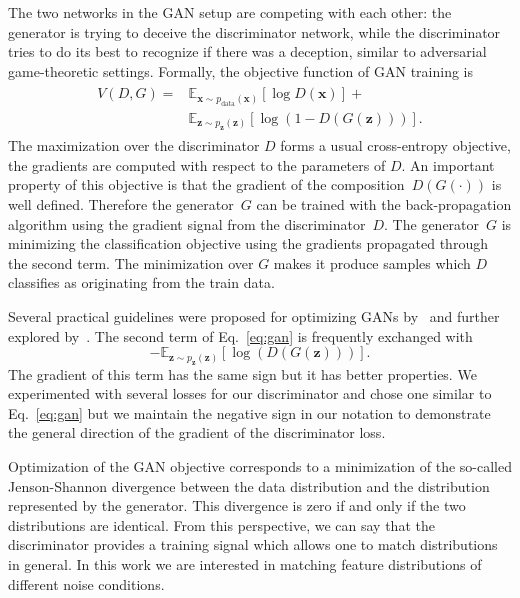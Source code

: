 \documentclass[a4paper]{article}
\begin{document}
    The two networks in the GAN setup are competing with each other: the 
    generator is trying to deceive the discriminator network, while the discriminator tries
    to do its best to recognize if there was a deception, similar to adversarial game-theoretic settings.    
    Formally, the objective function of GAN training is
    \begin{align}
    \begin{split}
        V(D, G) = &\mathbb{E}_{\bm{x} \sim p_{\text{data}}(\bm{x})}[\log D(\bm{x})] + \\
            &\mathbb{E}_{\bm{z} \sim p_{\bm{z}}(\bm{z})}[\log (1 - D(G(\bm{z})))].
    \end{split}
    \label{eq:gan}
    \end{align}
    The maximization over the discriminator $D$ forms a usual cross-entropy objective, the gradients are
    computed with respect to the parameters of $D$. An important property of
    this objective is that the gradient of the composition~$D(G(\cdot))$ is well
    defined. Therefore the generator~$G$ can be trained with the back-propagation
    algorithm using the gradient signal from the discriminator~$D$.
    The generator~$G$ is
    minimizing the classification objective using the gradients
    propagated through the second term. The minimization over $G$ makes it
    produce samples which $D$ classifies as originating from the train data.

    Several practical guidelines were proposed for optimizing GANs by~\cite{radford2015unsupervised} and 
    further explored by~\cite{salimans2016improved}. The second term of Eq.~\ref{eq:gan}
    is frequently exchanged with
    \begin{equation}
        - \mathbb{E}_{\bm{z} \sim p_{\bm{z}}(\bm{z})}[\log (D(G(\bm{z})))].
    \end{equation}
    The gradient of this term has the same sign but it has better properties.
    We experimented with several losses for our discriminator and chose one
    similar to Eq.~\ref{eq:gan} but we maintain the negative sign in our notation
    to demonstrate the general direction of the gradient of the discriminator loss.

    Optimization of the GAN objective corresponds to a minimization of the
    so-called Jenson-Shannon divergence between the data distribution and the
    distribution represented by the generator. This divergence is zero if and
    only if the two distributions are identical. From this perspective, we can
    say that the discriminator provides a training signal which allows
    one to match distributions in general. In this work we are interested in
    matching feature distributions of different noise conditions.
\end{document}
